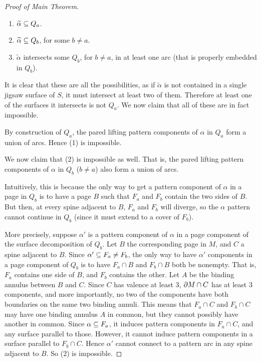 \begin{proof}[Proof of Main Theorem]
\begin{enumerate}
\item $\widetilde{\alpha} \subseteq Q_a$.

\item $\widetilde{\alpha} \subseteq Q_b$, for some $b \neq a$.

\item $\widetilde{\alpha}$ intersects some $Q_b$, for $b \neq a$, in at least
one arc (that is properly embedded in $Q_b$).

\end{enumerate}

It is clear that these are all the possibilities, as if $\widetilde{\alpha}$ is
not contained in a single jigsaw surface of $S$, it must intersect at least two
of them. Therefore at least one of the surfaces it intersects is not $Q_a$. We
now claim that all of these are in fact impossible.

By construction of $Q_a$, the pared lifting pattern components of $\alpha$ in
$Q_a$ form a union of arcs. Hence (1) is impossible.

We now claim that (2) is impossible as well. That is, the pared lifting pattern
components of $\alpha$ in $Q_b$ ($b \neq a$) also form a union of arcs.

Intuitively, this is because the only way to get a pattern component of
$\alpha$ in a page in $Q_b$ is to have a page $B$ such that $F_a$ and $F_b$
contain the two sides of $B$.  But then, at every spine adjacent to $B$, $F_a$
and $F_b$ will diverge, so the $\alpha$ pattern cannot continue in $Q_b$ (since
it must extend to a cover of $F_b$).

More precisely, suppose $\alpha'$ is a pattern component of $\alpha$ in a page
component of the surface decomposition of $Q_b$. Let $B$ the corresponding page
in $M$, and $C$ a spine adjacent to $B$. Since $\alpha' \subseteq F_a \neq F_b$, the
only way to have $\alpha'$ components in a page component of $Q_b$ is to have
$F_a \cap B$ and $F_b \cap B$ both be nonempty. That is, $F_a$ contains one
side of $B$, and $F_b$ contains the other. Let $A$ be the binding annulus
between $B$ and $C$.  Since $C$ has valence at least 3, $\partial M \cap C$ has at
least 3 components, and more importantly, no two of the components have both
boundaries on the same two binding annuli. This means that $F_a \cap C$ and
$F_b \cap C$ may have one binding annulus $A$ in common, but they cannot
possibly have another in common.  Since $\alpha \subseteq F_a$, it induces pattern
components in $F_a \cap C$, and any surface parallel to those. However, it
cannot induce pattern components in a surface parallel to $F_b \cap C$. Hence
$\alpha'$ cannot connect to a pattern arc in any spine adjacent to $B$. So (2)
is impossible.


\end{proof}
